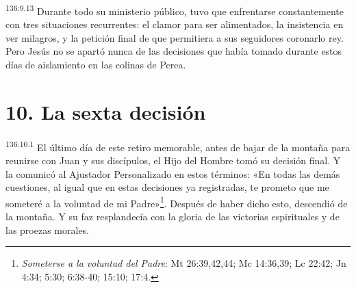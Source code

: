 \par 
\textsuperscript{136:9.13} Durante todo su ministerio público, tuvo que enfrentarse constantemente con tres situaciones recurrentes: el clamor para ser alimentados, la insistencia en ver milagros, y la petición final de que permitiera a sus seguidores coronarlo rey. Pero Jesús no se apartó nunca de las decisiones que había tomado durante estos días de aislamiento en las colinas de Perea.

\section*{10. La sexta decisión}
\par 
\textsuperscript{136:10.1} El último día de este retiro memorable, antes de bajar de la montaña para reunirse con Juan y sus discípulos, el Hijo del Hombre tomó su decisión final. Y la comunicó al Ajustador Personalizado en estos términos: «En todas las demás cuestiones, al igual que en estas decisiones ya registradas, te prometo que me someteré a la voluntad de mi Padre»\footnote{\textit{Someterse a la voluntad del Padre}: Mt 26:39,42,44; Mc 14:36,39; Lc 22:42; Jn 4:34; 5:30; 6:38-40; 15:10; 17:4.}. Después de haber dicho esto, descendió de la montaña. Y su faz resplandecía con la gloria de las victorias espirituales y de las proezas morales.